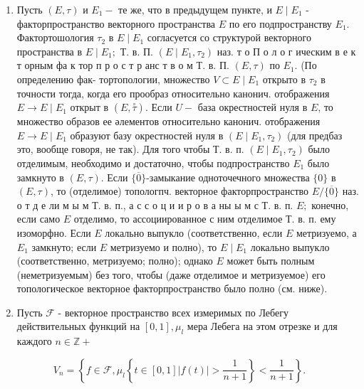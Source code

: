 \documentclass[10pt]{article}
\begin{document}
\begin{enumerate}
  \item Пусть $(E, \tau)$ и $E_{1}-$ те же, что в предыдущем пункте, и $E \mid E_{1}$ - факторпространство векторного пространства $E$ по его подпространству $E_{1}$. Фактортошология $\tau_{2}$ в $E \mid E_{1}$ согласуется со структурой векторного пространства в $E \mid E_{1} ;$ Т. в. П. $\left(E \mid E_{1}, \tau_{2}\right)$ наз. т о П о л о г ическим в е к т орным фа к тор п р о с т р анс т в о м Т. в. П. $(E, \tau)$ по $E_{1}$. (По определению фак- тортопологии, множество $V \subset E \mid E_{1}$ открыто в $\tau_{2}$ в точности тогда, когда его прообраз относительно канонич. отображения $E \rightarrow E \mid E_{1}$ открыт в $(E, \stackrel{\circ}{\tau})$. Если $U-$ база окрестностей нуля в $E$, то множество образов ее әлементов относительно канонич. отображения $E \rightarrow E \mid E_{1}$ образуют базу окрестностей нуля в $\left(E \mid E_{1}, \tau_{2}\right)$ (для предбаз это, вообще говоря, не так). Для того чтобы Т. в. п. $\left(E \mid E_{1}, \tau_{2}\right)$ было отделимым, необходимо и достаточно, чтобы подпространство $E_{1}$ было замкнуто в $(E, \tau)$. Если $\{\overline{0}\}$-замыкание одноточечного множества $\{0\}$ в $(E, \tau)$, то (отделимое) топологпч. векторное факторпространство $E /\{\overline{0}\}$ наз. о т д е ли м ы м Т. в. п., а с с о ц и и р о в а ны ы м с Т. в. п. $E ;$ конечно, если само $E$ отделимо, то ассоциированное с ним отделимое Т. в. п. ему изоморфно. Если $E$ локально выпукло (соответственно, если $E$ метризуемо, а $E_{1}$ замкнуто; если $E$ метризуемо и полно), то $E \mid E_{1}$ локально выпукло (соответственно, метризуемо; полно); однако $E$ может быть полным (неметризуемым) без того, чтобы (даже отделимое и метризуемое) его топологическое векторное факторпространство было полно (см. ниже).



  \item Пусть $\mathscr{F}$ - векторное пространство всех измеримых по Лебегу действительных функций на $[0,1], \mu_{l}$ мера Лебега на этом отрезке и для каждого $n \in \mathbb{Z}+$



\end{enumerate}



\[

V_{n}=\left\{f \in \mathscr{F}, \mu_{l}\left\{t \in[0,1]|f(t)|>\frac{1}{n+1}\right\}<\frac{1}{n+1}\right\} .

\]
\end{document}
